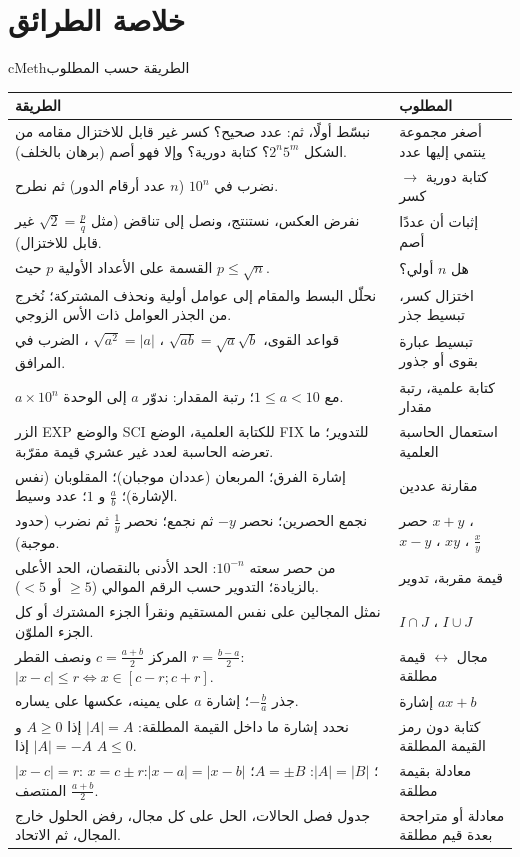 \documentclass[12pt,a4paper]{article}
\newenvironment{BOX}[2]{\begin{otherlanguage}{english}\begin{arbox}{#1}{#2}}{\end{arbox}\end{otherlanguage}}
\begin{document}
\section{خلاصة الطرائق}
\begin{BOX}{cMeth}{الطريقة حسب المطلوب}
\begin{center}
\renewcommand{\arraystretch}{1.3}
\begin{tabular}{|p{}|p{}|}\hline
\rowcolor{cSec!12} \textbf{الطريقة} & \textbf{المطلوب}\\\hline
نبسّط أولًا، ثم: عدد صحيح؟ كسر غير قابل للاختزال مقامه من الشكل $2^{n}5^{m}$؟ كتابة دورية؟ وإلا فهو أصم (برهان بالخلف). & أصغر مجموعة ينتمي إليها عدد\\\hline
نضرب في $10^{n}$ ($n$ عدد أرقام الدور) ثم نطرح. & كتابة دورية $\to$ كسر\\\hline
نفرض العكس، نستنتج، ونصل إلى تناقض (مثل $\sqrt{2}=\frac{p}{q}$ غير قابل للاختزال). & إثبات أن عددًا أصم\\\hline
القسمة على الأعداد الأولية $p$ حيث $p\leqslant\sqrt{n}$. & هل $n$ أولي؟\\\hline
نحلّل البسط والمقام إلى عوامل أولية ونحذف المشتركة؛ نُخرج من الجذر العوامل ذات الأس الزوجي. & اختزال كسر، تبسيط جذر\\\hline
قواعد القوى، $\sqrt{ab}=\sqrt{a}\sqrt{b}$ ، $\sqrt{a^{2}}=|a|$ ، الضرب في المرافق. & تبسيط عبارة بقوى أو جذور\\\hline
$a\times10^{n}$ مع $1\leqslant a<10$؛ رتبة المقدار: ندوّر $a$ إلى الوحدة. & كتابة علمية، رتبة مقدار\\\hline
الزر EXP والوضع SCI للكتابة العلمية، الوضع FIX للتدوير؛ ما تعرضه الحاسبة لعدد غير عشري قيمة مقرّبة. & استعمال الحاسبة العلمية\\\hline
إشارة الفرق؛ المربعان (عددان موجبان)؛ المقلوبان (نفس الإشارة)؛ $\frac{a}{b}$ و $1$؛ عدد وسيط. & مقارنة عددين\\\hline
نجمع الحصرين؛ نحصر $-y$ ثم نجمع؛ نحصر $\frac{1}{y}$ ثم نضرب (حدود موجبة). & حصر $x+y$ ، $x-y$ ، $xy$ ، $\frac{x}{y}$\\\hline
من حصر سعته $10^{-n}$: الحد الأدنى بالنقصان، الحد الأعلى بالزيادة؛ التدوير حسب الرقم الموالي ($\geqslant5$ أو $<5$). & قيمة مقربة، تدوير\\\hline
نمثل المجالين على نفس المستقيم ونقرأ الجزء المشترك أو كل الجزء الملوّن. & $I\cap J$ ، $I\cup J$\\\hline
المركز $c=\frac{a+b}{2}$ ونصف القطر $r=\frac{b-a}{2}$: $|x-c|\leqslant r\iff x\in[c-r;c+r]$. & مجال $\leftrightarrow$ قيمة مطلقة\\\hline
جذر $-\frac{b}{a}$؛ إشارة $a$ على يمينه، عكسها على يساره. & إشارة $ax+b$\\\hline
نحدد إشارة ما داخل القيمة المطلقة: $|A|=A$ إذا $A\geqslant0$ و $|A|=-A$ إذا $A\leqslant0$. & كتابة دون رمز القيمة المطلقة\\\hline
$|x-c|=r$: $x=c\pm r$؛ $|A|=|B|$: $A=\pm B$؛ $|x-a|=|x-b|$: المنتصف $\frac{a+b}{2}$. & معادلة بقيمة مطلقة\\\hline
جدول فصل الحالات، الحل على كل مجال، رفض الحلول خارج المجال، ثم الاتحاد. & معادلة أو متراجحة بعدة قيم مطلقة\\\hline
\end{tabular}
\end{center}
\end{BOX}
\end{document}
